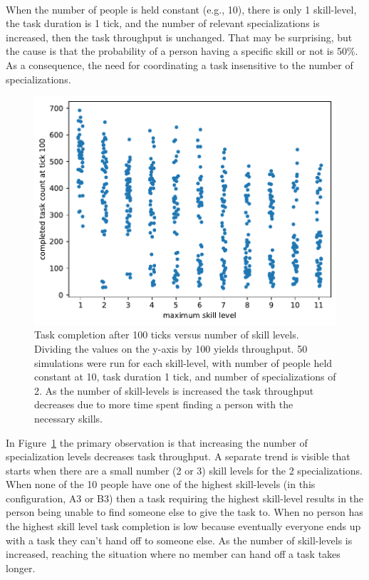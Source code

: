 \ \\

When the number of people is held constant (e.g., 10), there is only 1 skill-level, the task duration is 1 tick, and the number of relevant specializations is increased, then the task throughput is unchanged. That may be surprising, but the cause is that the probability of a person having a specific skill or not is 50\%. As a consequence, the need for coordinating a task insensitive to the number of specializations.



\begin{figure}[!htb] %
\centering
\iftoggle{narrowpage}{\newcommand\imgwidth{1}}{\newcommand\imgwidth{0.7}}
\includegraphics[width=\imgwidth\textwidth]{images/task_distribution_completed_versus_size_simCount50_skills2_levels1to12_taskduration1_people10_social0_ticks100.pdf}
\caption{Task completion after 100 ticks versus number of skill levels. Dividing the values on the y-axis by 100 yields throughput. 50 simulations were run for each skill-level, with number of people held constant at 10, task duration 1 tick, and number of specializations of 2. 
As the number of skill-levels is increased the task throughput decreases due to more time spent finding a person with the necessary skills. 
}
\label{fig:task-distribution-completed-vs-size}
\end{figure}

In Figure~\ref{fig:task-distribution-completed-vs-size} the primary observation is that increasing the number of specialization levels decreases task throughput. 
A separate trend is visible that starts when there are a small number (2 or 3) skill levels for the 2 specializations. When none of the 10 people have one of the highest skill-levels (in this configuration, A3 or B3) then a task requiring the highest skill-level results in the person being unable to find someone else to give the task to. When no person has the highest skill level task completion is low because eventually everyone ends up with a task they can't hand off to someone else. As the number of skill-levels is increased, reaching the situation where no member can hand off a task takes longer. 


